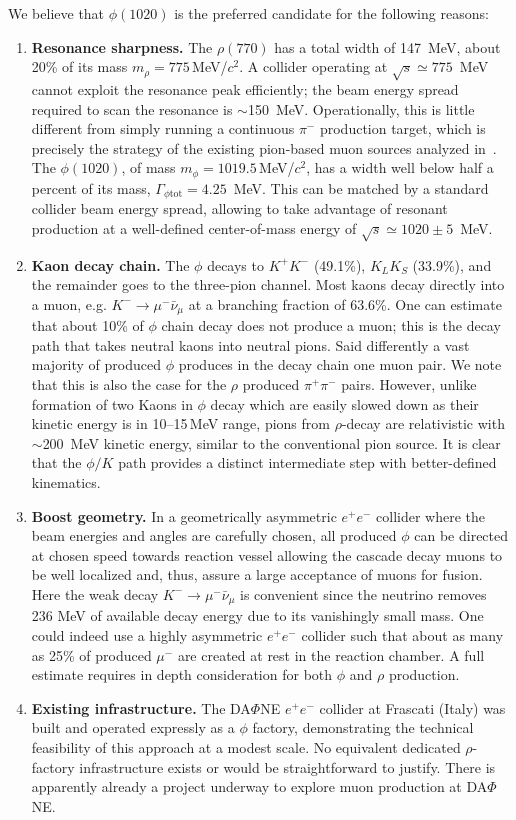\documentclass[particles,article,accept,pdftex,moreauthors]{Definitions/mdpi}
\begin{document}
We believe that $\phi(1020)$ is the preferred candidate for the following reasons:
\begin{enumerate}[label=(\arabic*),nosep]
\item 
\textbf{Resonance sharpness.} The $\rho(770)$ has a total width of 147~MeV, about 20\% of its mass $m_\rho=775$\,MeV/$c^2$. A collider operating at $\sqrt{s}\simeq 775$~MeV cannot exploit the resonance peak efficiently; the beam energy spread required to scan the resonance is $\sim$150~MeV. Operationally, this is little different from simply running a continuous $\pi^-$ production target, which is precisely the strategy of the existing pion-based muon sources analyzed in~\cite{Rafelski:1991DOE}. The $\phi(1020)$, of mass $m_\phi=1019.5$\,MeV/$c^2$, has a width well below half a percent of its mass, $\Gamma_{\phi\mathrm{tot}} = 4.25$~MeV. This can be matched by a standard collider beam energy spread, allowing to take advantage of resonant production at a well-defined center-of-mass energy of $\sqrt{s}\simeq1020\pm 5$~MeV.
%
\item 
\textbf{Kaon decay chain.} The $\phi$ decays to $K^+K^-$ (49.1\%), $K_LK_S$ (33.9\%), and the remainder goes to the three-pion channel. Most kaons decay directly into a muon, e.g. $K^-\to\mu^-\bar\nu_\mu$ at a branching fraction of 63.6\%. One can estimate that about 10\% of $\phi$ chain decay does not produce a muon; this is the decay path that takes neutral kaons into neutral pions. Said differently a vast majority of produced $\phi$ produces in the decay chain one muon pair. We note that this is also the case for the $\rho$ produced $\pi^+\pi^-$ pairs. However, unlike formation of two Kaons in $\phi$ decay which are easily slowed down as their kinetic energy is in 10--15\,MeV range, pions from $\rho$-decay are relativistic with $\sim$200~MeV kinetic energy, similar to the conventional pion source. It is clear that the $\phi/K$ path provides a distinct intermediate step with better-defined kinematics.
\item 
\textbf{Boost geometry.} In a geometrically asymmetric $e^+e^-$ collider where the beam energies and angles are carefully chosen, all produced $\phi$ can be directed at chosen speed towards reaction vessel allowing the cascade decay muons to be well localized and, thus, assure a large acceptance of muons for fusion. Here the weak decay $K^-\to\mu^-\bar\nu_\mu$ is convenient since the neutrino removes 236 MeV of available decay energy due to its vanishingly small mass. One could indeed use a highly asymmetric $e^+e^-$ collider such that about as many as 25\% of produced $\mu^-$ are created at rest in the reaction chamber. A full estimate requires in depth consideration for both $\phi$ and $\rho$ production.
%
\item 
\textbf{Existing infrastructure.} The DA$\Phi$NE $e^+e^-$ collider at Frascati (Italy) was built and operated expressly as a $\phi$ factory, demonstrating the technical feasibility of this approach at a modest scale. No equivalent dedicated $\rho$-factory infrastructure exists or would be straightforward to justify. There is apparently already a project underway to explore muon production at DA$\Phi$NE.
\end{enumerate}
\end{document}
